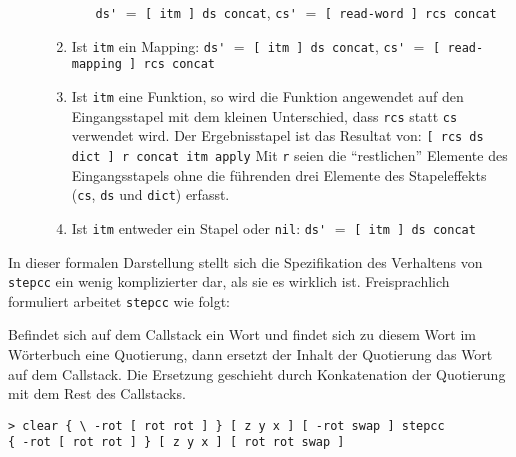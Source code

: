 \begin{description}
\begin{enumerate}
\begin{enumerate}
    \newline\verb|ds'| $=$ \verb|[ itm ] ds concat|,
    \newline\verb|cs'| $=$ \verb|[ read-word ] rcs concat|
  \end{enumerate}
\item Ist \verb|itm| ein Mapping:
  \newline\verb|ds'| $=$ \verb|[ itm ] ds concat|,
  \newline\verb|cs'| $=$ \verb|[ read-mapping ] rcs concat|
\item Ist \verb|itm| eine Funktion, \label{stepcc:fct}
  so wird die Funktion angewendet auf den Eingangsstapel mit dem
  kleinen Unterschied, dass \verb|rcs| statt \verb|cs| verwendet wird.
  Der Ergebnisstapel ist das Resultat von: 
  \newline\verb|[ rcs ds dict ] r concat itm apply|
  \newline Mit \verb|r| seien die "`restlichen"' Elemente des 
  Eingangsstapels ohne die führenden drei Elemente des Stapeleffekts
  (\verb|cs|, \verb|ds| und \verb|dict|) erfasst.
\item Ist \verb|itm| entweder ein Stapel oder \verb|nil|:
  \newline\verb|ds'| $=$ \verb|[ itm ] ds concat|
\end{enumerate}
\end{description}
% 

In dieser formalen Darstellung stellt sich die Spezifikation des Verhaltens von \verb|stepcc| ein wenig komplizierter dar, als sie es wirklich ist. Freisprachlich formuliert arbeitet \verb|stepcc| wie folgt:

Befindet sich auf dem Callstack ein Wort und findet sich zu diesem Wort im Wör\-ter\-buch eine Quotierung, dann ersetzt der Inhalt der Quotierung das Wort auf dem Callstack. Die Ersetzung geschieht durch Konkatenation der Quotierung mit dem Rest des Callstacks.

\begin{verbatim}
> clear { \ -rot [ rot rot ] } [ z y x ] [ -rot swap ] stepcc
{ -rot [ rot rot ] } [ z y x ] [ rot rot swap ]
\end{verbatim}


